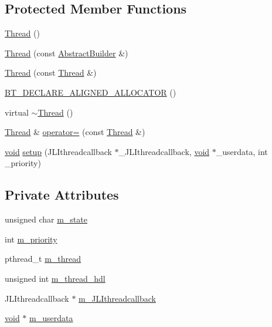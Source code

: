 \subsection*{Protected Member Functions}
\begin{DoxyCompactItemize}
\item 
\mbox{\hyperlink{classnjli_1_1_thread_a317e23ba8f0ced14960249e4c54c6090}{Thread}} ()
\item 
\mbox{\hyperlink{classnjli_1_1_thread_a0c051d119b52f3daec20229275c5f889}{Thread}} (const \mbox{\hyperlink{classnjli_1_1_abstract_builder}{Abstract\+Builder}} \&)
\item 
\mbox{\hyperlink{classnjli_1_1_thread_ab2c08ff55a50001e1da7e03b2a91f59f}{Thread}} (const \mbox{\hyperlink{classnjli_1_1_thread}{Thread}} \&)
\item 
\mbox{\hyperlink{classnjli_1_1_thread_afb0a6e67e331179054954ece61fc0b9c}{B\+T\+\_\+\+D\+E\+C\+L\+A\+R\+E\+\_\+\+A\+L\+I\+G\+N\+E\+D\+\_\+\+A\+L\+L\+O\+C\+A\+T\+OR}} ()
\item 
virtual \mbox{\hyperlink{classnjli_1_1_thread_aa7d7a6a932929386936089618d4d7e3e}{$\sim$\+Thread}} ()
\item 
\mbox{\hyperlink{classnjli_1_1_thread}{Thread}} \& \mbox{\hyperlink{classnjli_1_1_thread_a6de32ea344863fe165a1200e36b36dc4}{operator=}} (const \mbox{\hyperlink{classnjli_1_1_thread}{Thread}} \&)
\item 
\mbox{\hyperlink{_thread_8h_af1e856da2e658414cb2456cb6f7ebc66}{void}} \mbox{\hyperlink{classnjli_1_1_thread_ad6f6f4cf48168e85787ad3c0d91f4d3d}{setup}} (J\+L\+Ithreadcallback $\ast$\+\_\+\+J\+L\+Ithreadcallback, \mbox{\hyperlink{_thread_8h_af1e856da2e658414cb2456cb6f7ebc66}{void}} $\ast$\+\_\+userdata, int \+\_\+priority)
\end{DoxyCompactItemize}
\subsection*{Private Attributes}
\begin{DoxyCompactItemize}
\item 
unsigned char \mbox{\hyperlink{classnjli_1_1_thread_a71f3ffb5bb782ea51fc7965a73d26228}{m\+\_\+state}}
\item 
int \mbox{\hyperlink{classnjli_1_1_thread_ad565b076bed5d905b4c8b55446106515}{m\+\_\+priority}}
\item 
pthread\+\_\+t \mbox{\hyperlink{classnjli_1_1_thread_a585b618ef3f37b59ed87b9a260b75316}{m\+\_\+thread}}
\item 
unsigned int \mbox{\hyperlink{classnjli_1_1_thread_ac9a03c44d01aaa3103b179edf04ba488}{m\+\_\+thread\+\_\+hdl}}
\item 
J\+L\+Ithreadcallback $\ast$ \mbox{\hyperlink{classnjli_1_1_thread_ac180ff8a9b724385c44beafb47988a3a}{m\+\_\+\+J\+L\+Ithreadcallback}}
\item 
\mbox{\hyperlink{_thread_8h_af1e856da2e658414cb2456cb6f7ebc66}{void}} $\ast$ \mbox{\hyperlink{classnjli_1_1_thread_a402f192eba9cdf6c041e050b9dd1a5f5}{m\+\_\+userdata}}
\end{DoxyCompactItemize}
